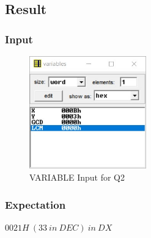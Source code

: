 \documentclass{article}
\begin{document}
\subsection{Result}
\subsubsection{Input}
 \begin{figure}[h]
\begin{center}
\includegraphics[width=0.45\textwidth]{LCM_IN} 
\caption{VARIABLE Input for Q2 }
\end{center}
\end{figure}
 
\subsubsection{Expectation}
$
 0021H\ (33\ in\ DEC)\ in\ DX 
$ 

\end{document}
